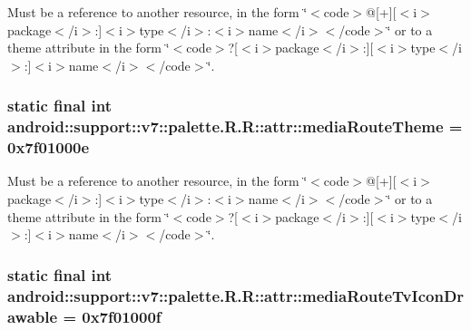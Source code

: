 Must be a reference to another resource, in the form \char`\"{}$<$code$>$@\mbox{[}+\mbox{]}\mbox{[}$<$i$>$package$<$/i$>$:\mbox{]}$<$i$>$type$<$/i$>$:$<$i$>$name$<$/i$>$$<$/code$>$\char`\"{} or to a theme attribute in the form \char`\"{}$<$code$>$?\mbox{[}$<$i$>$package$<$/i$>$:\mbox{]}\mbox{[}$<$i$>$type$<$/i$>$:\mbox{]}$<$i$>$name$<$/i$>$$<$/code$>$\char`\"{}. \hypertarget{classandroid_1_1support_1_1v7_1_1palette_1_1_r_1_1attr_343a413d628fc1ca9ba9c5177afe866f}{
\subsubsection[{mediaRouteTheme}]{\setlength{\rightskip}{0pt plus 5cm}static final int android::support::v7::palette.R.R::attr::mediaRouteTheme = 0x7f01000e}}
\label{classandroid_1_1support_1_1v7_1_1palette_1_1_r_1_1attr_343a413d628fc1ca9ba9c5177afe866f}


Must be a reference to another resource, in the form \char`\"{}$<$code$>$@\mbox{[}+\mbox{]}\mbox{[}$<$i$>$package$<$/i$>$:\mbox{]}$<$i$>$type$<$/i$>$:$<$i$>$name$<$/i$>$$<$/code$>$\char`\"{} or to a theme attribute in the form \char`\"{}$<$code$>$?\mbox{[}$<$i$>$package$<$/i$>$:\mbox{]}\mbox{[}$<$i$>$type$<$/i$>$:\mbox{]}$<$i$>$name$<$/i$>$$<$/code$>$\char`\"{}. \hypertarget{classandroid_1_1support_1_1v7_1_1palette_1_1_r_1_1attr_fb98a2f0635e193eb7fd1aed21081ba6}{
\subsubsection[{mediaRouteTvIconDrawable}]{\setlength{\rightskip}{0pt plus 5cm}static final int android::support::v7::palette.R.R::attr::mediaRouteTvIconDrawable = 0x7f01000f}}
\label{classandroid_1_1support_1_1v7_1_1palette_1_1_r_1_1attr_fb98a2f0635e193eb7fd1aed21081ba6}


